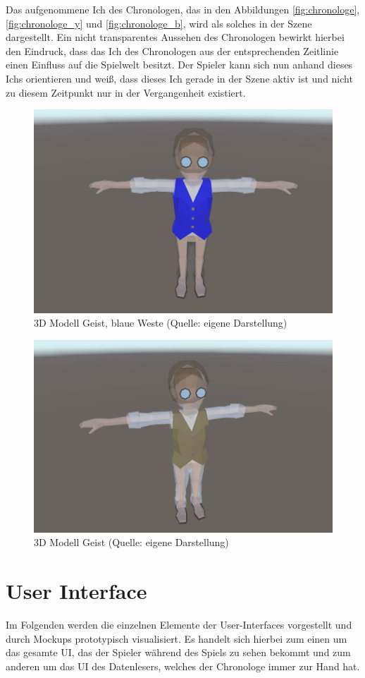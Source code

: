 Das aufgenommene Ich des Chronologen, das in den Abbildungen \ref{fig:chronologe},\ref{fig:chronologe_y} und \ref{fig:chronologe_b}, wird als solches in der Szene dargestellt. Ein nicht transparentes Aussehen des Chronologen bewirkt hierbei den Eindruck, dass das Ich des Chronologen aus der entsprechenden Zeitlinie einen Einfluss auf die Spielwelt besitzt. Der Spieler kann sich nun anhand dieses Ichs orientieren und weiß, dass dieses Ich gerade in der Szene aktiv ist und nicht zu diesem Zeitpunkt nur in der Vergangenheit existiert.
\begin{figure}[ht]
\centering
\includegraphics[width=0.8\linewidth]{content/pictures/Ghost_b.jpg}
\caption{3D Modell Geist, blaue Weste (Quelle: eigene Darstellung)}
\label{fig:ghost_b}
\end{figure}

\begin{figure}[ht]
\centering
\includegraphics[width=0.8\linewidth]{content/pictures/Ghost.jpg}
\caption{3D Modell Geist (Quelle: eigene Darstellung)}
\label{fig:ghost}
\end{figure}

\section{User Interface}\label{sec:user-interface}
Im Folgenden werden die einzelnen Elemente der User-Interfaces vorgestellt und durch Mockups prototypisch visualisiert. Es handelt sich hierbei zum einen um das gesamte \ac{UI}, das der Spieler während des Spiels zu sehen bekommt und zum anderen um das \ac{UI} des Datenlesers, welches der Chronologe immer zur Hand hat.
